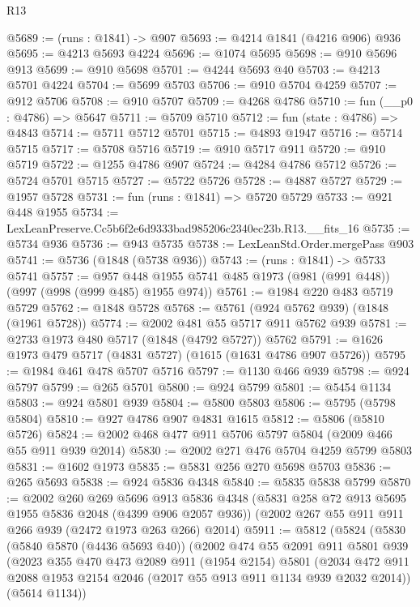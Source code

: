 \begin{lexlean}{R13}
\begin{coremodule}
@5689 := (runs : @1841) -> @907
@5693 := @4214 @1841 (@4216 @906) @936
@5695 := @4213 @5693 @4224
@5696 := @1074 @5695
@5698 := @910 @5696 @913
@5699 := @910 @5698
@5701 := @4244 @5693 @40
@5703 := @4213 @5701 @4224
@5704 := @5699 @5703
@5706 := @910 @5704 @4259
@5707 := @912 @5706
@5708 := @910 @5707
@5709 := @4268 @4786
@5710 := fun (__p0 : @4786) => @5647
@5711 := @5709 @5710
@5712 := fun (state : @4786) => @4843
@5714 := @5711 @5712 @5701
@5715 := @4893 @1947
@5716 := @5714 @5715
@5717 := @5708 @5716
@5719 := @910 @5717 @911
@5720 := @910 @5719
@5722 := @1255 @4786 @907
@5724 := @4284 @4786 @5712
@5726 := @5724 @5701 @5715
@5727 := @5722 @5726
@5728 := @4887 @5727
@5729 := @1957 @5728
@5731 := fun (runs : @1841) => @5720 @5729
@5733 := @921 @448 @1955
@5734 := LexLeanPreserve.Cc5b6f2e6d9333bad985206c2340ec23b.R13.__fits_16
@5735 := @5734 @936
@5736 := @943 @5735
@5738 := LexLeanStd.Order.mergePass @903
@5741 := @5736 (@1848 (@5738 @936))
@5743 := (runs : @1841) -> @5733 @5741
@5757 := @957 @448 @1955 @5741 @485 @1973 (@981 (@991 @448)) (@997 (@998 (@999 @485) @1955 @974))
@5761 := @1984 @220 @483 @5719 @5729
@5762 := @1848 @5728
@5768 := @5761 (@924 @5762 @939) (@1848 (@1961 @5728))
@5774 := @2002 @481 @55 @5717 @911 @5762 @939
@5781 := @2733 @1973 @480 @5717 (@1848 (@4792 @5727)) @5762
@5791 := @1626 @1973 @479 @5717 (@4831 @5727) (@1615 (@1631 @4786 @907 @5726))
@5795 := @1984 @461 @478 @5707 @5716
@5797 := @1130 @466 @939
@5798 := @924 @5797
@5799 := @265 @5701
@5800 := @924 @5799
@5801 := @5454 @1134
@5803 := @924 @5801 @939
@5804 := @5800 @5803
@5806 := @5795 (@5798 @5804)
@5810 := @927 @4786 @907 @4831 @1615
@5812 := @5806 (@5810 @5726)
@5824 := @2002 @468 @477 @911 @5706 @5797 @5804 (@2009 @466 @55 @911 @939 @2014)
@5830 := @2002 @271 @476 @5704 @4259 @5799 @5803
@5831 := @1602 @1973
@5835 := @5831 @256 @270 @5698 @5703
@5836 := @265 @5693
@5838 := @924 @5836 @4348
@5840 := @5835 @5838 @5799
@5870 := @2002
    @260
    @269
    @5696
    @913
    @5836
    @4348
    (@5831 @258 @72 @913 @5695 @1955 @5836 @2048 (@4399 @906 @2057 @936))
    (@2002 @267 @55 @911 @911 @266 @939 (@2472 @1973 @263 @266) @2014)
@5911 := @5812
    (@5824
      (@5830
        (@5840 @5870 (@4436 @5693 @40))
        (@2002
          @474
          @55
          @2091
          @911
          @5801
          @939
          (@2023
            @355
            @470
            @473
            @2089
            @911
            (@1954 @2154)
            @5801
            (@2034 @472 @911 @2088 @1953 @2154 @2046 (@2017 @55 @913 @911 @1134 @939 @2032 @2014))
            (@5614 @1134))

\end{coremodule}
\end{lexlean}
